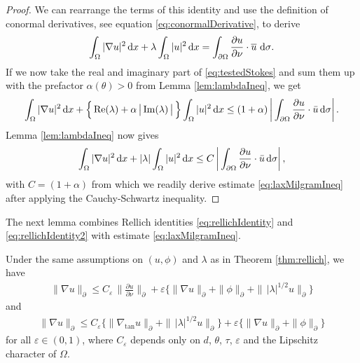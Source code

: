 \begin{proof}
  We can rearrange the terms of this identity and use the definition of conormal derivatives, see equation \eqref{eq:conormalDerivative}, to derive
  \begin{align}
    \label{eq:testedStokes}
    \int_\Omega |\nabla u|^2 \, {\operatorname{d}\!{x}} + \lambda \int_\Omega |u|^2 \, {\operatorname{d}\!{x}} = \int_{\partial\Omega} \frac{\partial u}{\partial \nu} \cdot \overline u \, \, {\operatorname{d}\!{\sigma}}.
  \end{align}
  If we now take the real and imaginary part of \eqref{eq:testedStokes} and sum them up with the prefactor $\alpha(\theta) > 0$ from Lemma \ref{lem:lambdaIneq}, we get
  \begin{align*}
    \int_\Omega |\nabla u|^2 \, {\operatorname{d}\!{x}} + \Big\{ \operatorname{Re}(\lambda) + \alpha\, \big|\operatorname{Im}(\lambda)\,\big|\, \Big\} \int_\Omega |u|^2 \, {\operatorname{d}\!{x}}
    \leq (1 + \alpha) \, \bigg| \int_{\partial\Omega} \frac{\partial u}{\partial \nu} \cdot \bar u \, {\operatorname{d}\!{\sigma}} \bigg|\,.
  \end{align*}
  Lemma \ref{lem:lambdaIneq} now gives
  \begin{align*}
    \int_\Omega |\nabla u|^2 \, {\operatorname{d}\!{x}} + |\lambda| \int_\Omega |u|^2 \, {\operatorname{d}\!{x}} \leq C\,  \bigg| \int_{\partial\Omega} \frac{\partial u}{\partial \nu} \cdot \bar u \, {\operatorname{d}\!{\sigma}} \bigg|\,,
  \end{align*}
  with $C = (1 + \alpha)$ from which we readily derive estimate \eqref{eq:laxMilgramIneq} after applying the Cauchy-Schwartz inequality.
\end{proof}

The next lemma combines Rellich identities \eqref{eq:rellichIdentity} and \eqref{eq:rellichIdentity2} with estimate \eqref{eq:laxMilgramIneq}.

\begin{lem}
  Under the same assumptions on $(u,\phi)$ and $\lambda$ as in Theorem \ref{thm:rellich}, we have
  \begin{align}
    \label{eq:gradEstimateRellich}
    \| \nabla u\|_\partial \leq C_\varepsilon \,\Big\| \frac{\partial u}{\partial \nu} \Big\|_\partial + \varepsilon \Big\{ \|\nabla u\|_\partial + \|\phi\|_\partial + \| \, |\lambda|^{1/2} u\|_\partial \Big\}
  \end{align}
  and
  \begin{align}
    \label{eq:gradEstimateRellich2}
    \|\nabla u\|_\partial \leq C_\varepsilon \Big\{ \|\nabla_{\mathrm{tan}} u \|_\partial + \|\, |\lambda|^{1/2} u\|_\partial \Big\} + \varepsilon \big\{ \|\nabla u\|_\partial + \|\phi\|_\partial \big\}
  \end{align}
  for all $\varepsilon \in (0,1)$, where $C_\varepsilon$ depends only on $d$, $\theta$, $\tau$, $\varepsilon$ and the Lipschitz character of $\Omega$.
\end{lem}

